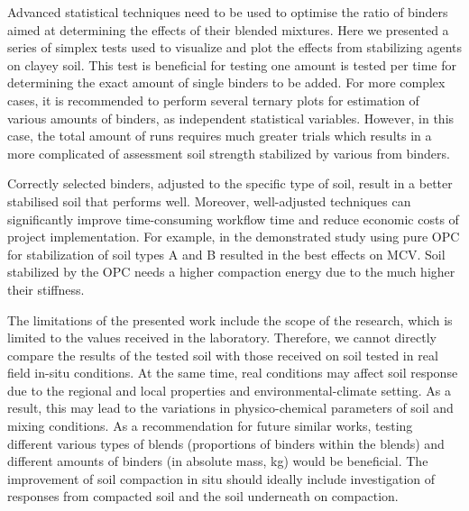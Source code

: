 \documentclass[electronics,article,submit,pdftex,moreauthors]{Definitions/mdpi}
\begin{document}
Advanced statistical techniques need to be used to optimise the ratio of binders aimed at determining the effects of their blended mixtures. Here we presented a series of simplex tests used to visualize and plot the effects from stabilizing agents on clayey soil. This test is beneficial for testing one amount is tested per time for determining the exact amount of single binders to be added. For more complex cases, it is recommended to perform several ternary plots for estimation of various amounts of binders, as independent statistical variables. However, in this case, the total amount of runs requires much greater trials which results in a more complicated of assessment soil strength stabilized by various from binders. 

Correctly selected binders, adjusted to the specific type of soil, result in a better stabilised soil that performs well. Moreover, well-adjusted techniques can significantly improve time-consuming workflow time and reduce economic costs of project implementation. For example, in the demonstrated study using pure OPC for stabilization of soil types A and B resulted in the best effects on MCV. Soil stabilized by the OPC needs a higher compaction energy due to the much higher their stiffness. 
	
The limitations of the presented work include the scope of the research, which is limited to the values received in the laboratory. Therefore, we cannot directly compare the results of the tested soil with those received on soil tested in real field in-situ conditions. At the same time, real conditions may affect soil response due to the regional and local properties and environmental-climate setting. As a result, this may lead to the variations in physico-chemical parameters of soil and mixing conditions. As a recommendation for future similar works, testing different various types of blends (proportions of binders within the blends) and different amounts of binders (in absolute mass, kg) would be beneficial. The improvement of soil compaction in situ should ideally include investigation of responses from compacted soil and the soil underneath on compaction. 

\vspace{6pt} 

\end{document}
